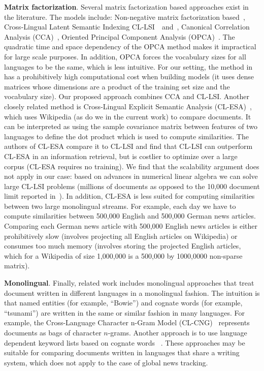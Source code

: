 \textbf{Matrix factorization}. Several matrix factorization based approaches exist in the literature. The models include: Non-negative matrix factorization based~\cite{nonnegfactor_lsi}, Cross-Lingual Latent Semantic Indexing CL-LSI~\cite{cl_lsi}~and~\cite{multilingualBook}, Canonical Correlation Analysis (CCA)~\cite{Hotelling}, Oriented Principal Component Analysis (OPCA)~\cite{platt2010translingual}. The quadratic time and space dependency of the OPCA method makes it impractical for large scale purposes. In addition, OPCA forces the vocabulary sizes for all languages to be the same, which is less intuitive. For our setting, the method in ~\cite{nonnegfactor_lsi} has a prohibitively high computational cost when building models (it uses dense matrices whose dimensions are a product of the training set size and the vocabulary size). Our proposed approach combines CCA and CL-LSI. Another closely related method is Cross-Lingual Explicit Semantic Analysis (CL-ESA)~\cite{ESA}, which uses Wikipedia (as do we in the current work) to compare documents. It can be interpreted as using the sample covariance matrix between features of two languages to define the dot product which is used to compute similarities.
The authors of CL-ESA compare it to CL-LSI and find that CL-LSI can outperform CL-ESA in an information retrieval, but is costlier to optimize over a large corpus (CL-ESA requires no training). We find that the scalability argument does not apply in our case: based on advances in numerical linear algebra we can solve large CL-LSI problems (millions of documents as opposed to the 10,000 document limit reported in~\cite{ESA}). In addition, CL-ESA is less suited for computing similarities between two large monolingual streams. For example, each day we have to compute similarities between 500,000 English and 500,000 German news articles. Comparing each German news article with 500,000 English news articles is either prohibitively slow (involves projecting all English articles on Wikipedia) or consumes too much memory (involves storing the projected English articles, which for a Wikipedia of size 1,000,000 is a 500,000 by 1000,0000 non-sparse matrix).

\textbf{Monolingual}. Finally, related work includes monolingual approaches that treat document written in different languages in a monolingual fashion. The intuition is that named entities (for example, ``Bowie'') and cognate words (for example, ``tsunami'') are written in the same or similar fashion in many languages. For example, the Cross-Language Character n-Gram Model (CL-CNG)~\cite{plagiarism} represents documents as bags of character $n$-grams. Another approach is to use language dependent keyword lists based on cognate words ~\cite{pouliquen2008story}. These approaches may be suitable for comparing documents written in languages that share a writing system, which does not apply to the case of global news tracking.


